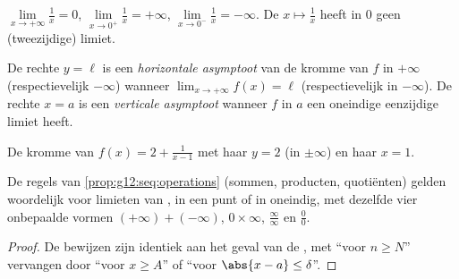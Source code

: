 \begin{example}
$\lim\limits_{x\to+\infty} \frac{1}{x} = 0$,
$\lim\limits_{x\to 0^+} \frac{1}{x} = +\infty$,
$\lim\limits_{x\to 0^-} \frac{1}{x} = -\infty$. De 
$x \mapsto \frac1x$ heeft in $0$ geen (tweezijdige) limiet.
\end{example}

\begin{definition}[Asymptoten]\label{def:g12:limcont:asymptote}
De rechte $y = \ell$ is een \emph{horizontale asymptoot} van
de kromme van $f$ in $+\infty$ (respectievelijk $-\infty$) wanneer
$\lim_{x\to+\infty} f(x) = \ell$ (respectievelijk in $-\infty$). De rechte
$x = a$ is een \emph{verticale asymptoot} wanneer $f$ in $a$
een oneindige eenzijdige limiet heeft.
\end{definition}

\begin{omfigure}

{\small De kromme van $f(x) = 2 + \frac{1}{x-1}$ met haar  $y = 2$ (in $\pm\infty$) en haar  $x = 1$.}
\end{omfigure}

\begin{proposition}\label{prop:g12:limcont:operations}
De regels van \cref{prop:g12:seq:operations} (sommen, producten, quotiënten)
gelden woordelijk voor limieten van , in een punt of in oneindig, met
dezelfde vier onbepaalde vormen $(+\infty)+(-\infty)$, $0\times\infty$,
$\frac{\infty}{\infty}$ en $\frac{0}{0}$.
\end{proposition}

\begin{proof}
De bewijzen zijn identiek aan het geval van de , met ``voor $n \geq N$''
vervangen door ``voor $x \geq A$'' of ``voor $\abs{x-a} \leq \delta$''.
\end{proof}

